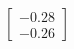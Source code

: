 \documentclass[preview]{standalone}
\begin{document}
\begin{align*}
\begin{bmatrix} -0.28 \\ -0.26 \end{bmatrix}
\end{align*}
\end{document}
